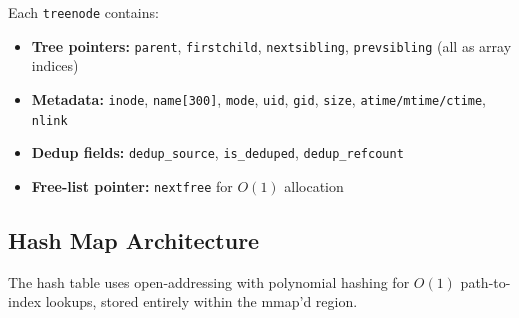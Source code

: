 \documentclass[12pt, a4paper]{article}
\begin{document}
Each \texttt{treenode} contains:
\begin{itemize}
  \item \textbf{Tree pointers:} \texttt{parent}, \texttt{firstchild}, \texttt{nextsibling}, \texttt{prevsibling} (all as array indices)
  \item \textbf{Metadata:} \texttt{inode}, \texttt{name[300]}, \texttt{mode}, \texttt{uid}, \texttt{gid}, \texttt{size}, \texttt{atime/mtime/ctime}, \texttt{nlink}
  \item \textbf{Dedup fields:} \texttt{dedup\_source}, \texttt{is\_deduped}, \texttt{dedup\_refcount}
  \item \textbf{Free-list pointer:} \texttt{nextfree} for $O(1)$ allocation
\end{itemize}

\subsection{Hash Map Architecture}

The hash table uses open-addressing with polynomial hashing for $O(1)$ path-to-index lookups, stored entirely within the mmap'd region.
\end{document}
